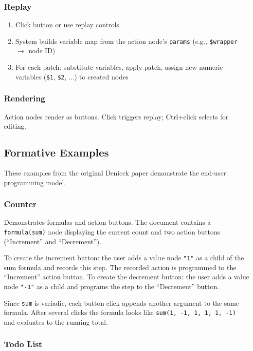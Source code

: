 \documentclass{article}
\begin{document}
\subsubsection{Replay}

\begin{enumerate}
\item Click button or use replay controls
\item System builds variable map from the action node's \texttt{params} (e.g., \texttt{\$wrapper} $\rightarrow$ node ID)
\item For each patch: substitute variables, apply patch, assign new numeric variables (\texttt{\$1}, \texttt{\$2}, ...) to created nodes
\end{enumerate}

\subsubsection{Rendering}

Action nodes render as buttons. Click triggers replay; Ctrl+click selects for editing.


\subsection{Formative Examples}

These examples from the original Denicek paper demonstrate the end-user programming model.

\subsubsection{Counter}

Demonstrates formulas and action buttons. The document contains a \texttt{formula(sum)} node displaying the current count and two action buttons (``Increment'' and ``Decrement'').

To create the increment button: the user adds a value node \texttt{"1"} as a child of the sum formula and records this step. The recorded action is programmed to the ``Increment'' action button. To create the decrement button: the user adds a value node \texttt{"-1"} as a child and programs the step to the ``Decrement'' button.

Since \texttt{sum} is variadic, each button click appends another argument to the same formula. After several clicks the formula looks like \texttt{sum(1, -1, 1, 1, 1, -1)} and evaluates to the running total.

\subsubsection{Todo List}
\end{document}
